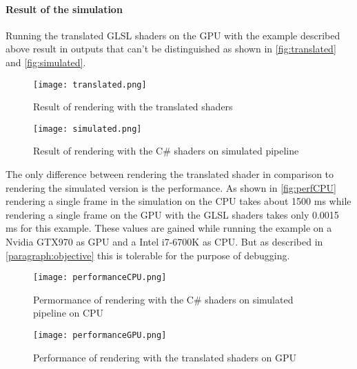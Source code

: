 \paragraph{Result of the simulation}

Running the translated GLSL shaders on the GPU with the example described above result in outputs that can't be distinguished as shown in \autoref{fig:translated} and \autoref{fig:simulated}.

\begin{figure}[h!]
    \centering
    \begin{minipage}{0.48\textwidth}
        \centering
        \texttt{[image: translated.png]} %
        \caption[Screenshot of example scene rendered with translated shaders]{Result of rendering with the translated shaders}
        \label{fig:translated}
    \end{minipage}\hfill
    \begin{minipage}{0.48\textwidth}
        \centering
        \texttt{[image: simulated.png]} %
        \caption[Screenshot of example scene rendered with C\# shaders on simulated pipeline]{Result of rendering with the C\# shaders on simulated pipeline}
        \label{fig:simulated}
    \end{minipage}
\end{figure}

The only difference between rendering the translated shader in comparison to rendering the simulated version is the performance. As shown in \autoref{fig:perfCPU} rendering a single frame in the simulation on the CPU takes about 1500 ms while rendering a single frame on the GPU with the GLSL shaders takes only 0.0015 ms for this example. These values are gained while running the example on a Nvidia GTX970 as GPU and a Intel i7-6700K as CPU. But as described in \autoref{paragraph:objective} this is tolerable for the purpose of debugging.

\begin{figure}[h!]
    \centering
    \begin{minipage}{0.58\textwidth}
        \centering
        \texttt{[image: performanceCPU.png]} %
        \caption[Screenshot of console output rendering the example with C\# shaders on simulated pipeline]{Permormance of rendering with the C\# shaders on simulated pipeline on CPU}
                \label{fig:perfCPU}
    \end{minipage}\hfill
    \begin{minipage}{0.38\textwidth}
        \centering
        \texttt{[image: performanceGPU.png]} %
        \caption[Screenshot of console output rendering the example with translated shaders]{Performance of rendering with the translated shaders on GPU}
        \label{fig:perfGPU}
    \end{minipage}
\end{figure}

